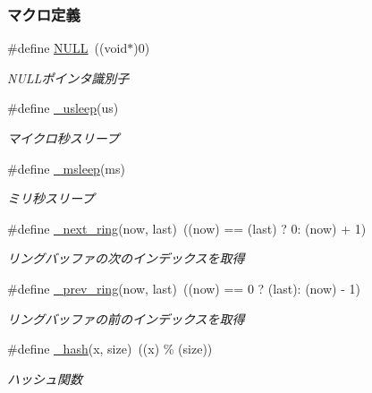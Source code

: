 \subsubsection*{マクロ定義}
\begin{DoxyCompactItemize}
\item 
\#define \hyperlink{stdlib_8h_a070d2ce7b6bb7e5c05602aa8c308d0c4_a070d2ce7b6bb7e5c05602aa8c308d0c4}{N\+U\+L\+L}~((void$\ast$)0)
\begin{DoxyCompactList}\small\item\em N\+U\+L\+Lポインタ識別子 \end{DoxyCompactList}\item 
\#define \hyperlink{stdlib_8h_a09ec6c9b71b1fc7389557ff54b39b5cb_a09ec6c9b71b1fc7389557ff54b39b5cb}{\+\_\+usleep}(us)                                                      
\begin{DoxyCompactList}\small\item\em マイクロ秒スリープ \end{DoxyCompactList}\item 
\#define \hyperlink{stdlib_8h_af540592c225c081e9b1423f257a240c1_af540592c225c081e9b1423f257a240c1}{\+\_\+msleep}(ms)                                                      
\begin{DoxyCompactList}\small\item\em ミリ秒スリープ \end{DoxyCompactList}\item 
\#define \hyperlink{stdlib_8h_ac9ca88c6f8f5736ffa1c2ec2b25efb88_ac9ca88c6f8f5736ffa1c2ec2b25efb88}{\+\_\+next\+\_\+ring}(now,  last)~((now) == (last) ? 0\+: (now) + 1)
\begin{DoxyCompactList}\small\item\em リングバッファの次のインデックスを取得 \end{DoxyCompactList}\item 
\#define \hyperlink{stdlib_8h_a4eede692f007e3fe43aa70025af238f9_a4eede692f007e3fe43aa70025af238f9}{\+\_\+prev\+\_\+ring}(now,  last)~((now) == 0 ? (last)\+: (now) -\/ 1)
\begin{DoxyCompactList}\small\item\em リングバッファの前のインデックスを取得 \end{DoxyCompactList}\item 
\#define \hyperlink{stdlib_8h_ae8d5719c510ca168d76e46106dbd8ccb_ae8d5719c510ca168d76e46106dbd8ccb}{\+\_\+hash}(x,  size)~((x) \% (size))
\begin{DoxyCompactList}\small\item\em ハッシュ関数 \end{DoxyCompactList}\end{DoxyCompactItemize}
